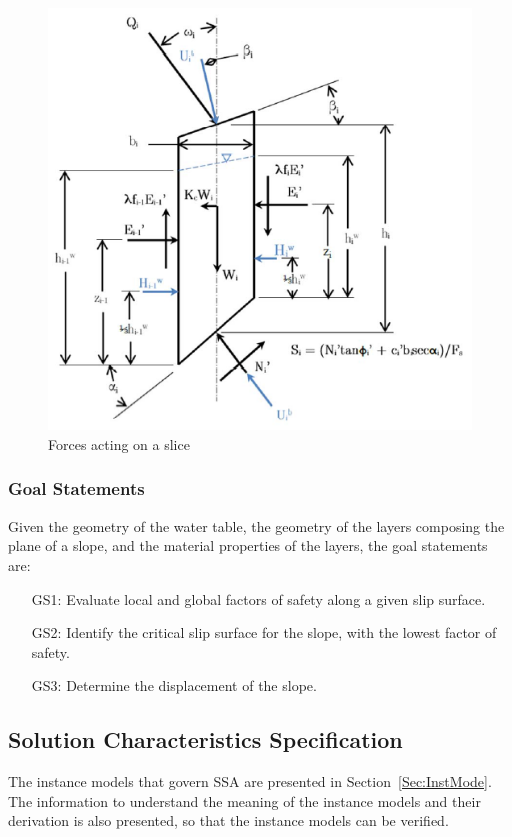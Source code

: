 \documentclass[12pt]{article}
\begin{document}
\begin{figure}
\begin{center}
\includegraphics[width=\textwidth]{ForceDiagram.png}
\caption{Forces acting on a slice}
\label{Figure:Forcactionaslic}
\end{center}
\end{figure}
\subsubsection{Goal Statements}
\label{Sec:GoalStat}
Given the geometry of the water table, the geometry of the layers composing the plane of a slope, and the material properties of the layers, the goal statements are:
\begin{itemize}
\item[GS1:]Evaluate local and global factors of safety along a given slip surface.
\item[GS2:]Identify the critical slip surface for the slope, with the lowest factor of safety.
\item[GS3:]Determine the displacement of the slope.
\end{itemize}
\subsection{Solution Characteristics Specification}
\label{Sec:SoluCharSpec}
The instance models that govern SSA are presented in Section~\ref{Sec:InstMode}. The information to understand the meaning of the instance models and their derivation is also presented, so that the instance models can be verified.
\end{document}
